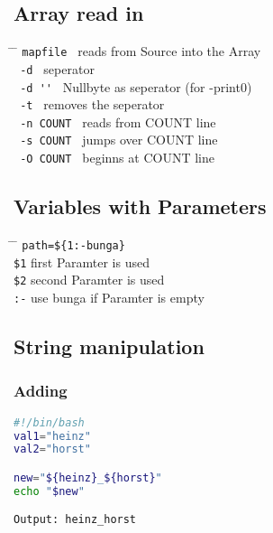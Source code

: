 \documentclass[a4paper,10pt]{article}
\begin{document}
\subsection{Array read in}
\begin{tabbing}
	\= \hspace{30mm} \= \hspace{50mm} \kill
	\> \verb|mapfile | \> reads from Source into the Array \\
	\> \verb| -d | \> seperator \\
	\> \verb| -d '' | \> Nullbyte as seperator (for -print0)\\
	\> \verb| -t | \> removes the seperator \\
	\> \verb| -n COUNT | \> reads from COUNT line \\
	\> \verb| -s COUNT | \> jumps over COUNT line \\
	\> \verb| -O COUNT | \> beginns at COUNT line \\
\end{tabbing}

\subsection{Variables with Parameters}
\begin{tabbing}
	\= \hspace{30mm} \= \hspace{50mm} \kill
	\> \verb|path=${1:-bunga}| \\
	\> \verb|$1| \> first Paramter is used \\
	\> \verb|$2| \> second Paramter is used \\
	\> \verb|:-| \> use bunga if Paramter is empty \\
\end{tabbing}

\subsection{String manipulation}
\subsubsection{Adding}
\begin{lstlisting}[language=bash]
#!/bin/bash 
val1="heinz"
val2="horst"

new="${heinz}_${horst}"
echo "$new"

Output: heinz_horst
\end{lstlisting}
\end{document}
